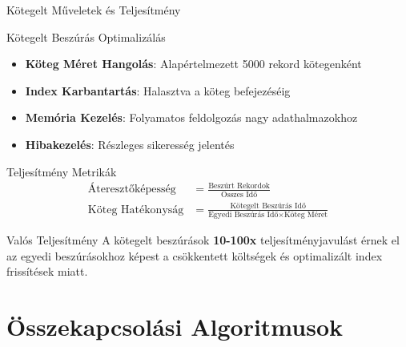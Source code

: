 \documentclass[aspectratio=169]{beamer}
\begin{document}
\begin{frame}{Kötegelt Műveletek és Teljesítmény}
\begin{block}{Kötegelt Beszúrás Optimalizálás}
\begin{itemize}
    \item \textbf{Köteg Méret Hangolás}: Alapértelmezett 5000 rekord kötegenként
    \item \textbf{Index Karbantartás}: Halasztva a köteg befejezéséig
    \item \textbf{Memória Kezelés}: Folyamatos feldolgozás nagy adathalmazokhoz
    \item \textbf{Hibakezelés}: Részleges sikeresség jelentés
\end{itemize}
\end{block}

\begin{block}{Teljesítmény Metrikák}
\begin{align}
\text{Áteresztőképesség} &= \frac{\text{Beszúrt Rekordok}}{\text{Összes Idő}} \\
\text{Köteg Hatékonyság} &= \frac{\text{Kötegelt Beszúrás Idő}}{\text{Egyedi Beszúrás Idő} \times \text{Köteg Méret}}
\end{align}
\end{block}

\begin{alertblock}{Valós Teljesítmény}
A kötegelt beszúrások \textbf{10-100x} teljesítményjavulást érnek el az egyedi beszúrásokhoz képest a csökkentett költségek és optimalizált index frissítések miatt.
\end{alertblock}
\end{frame}

\section{Összekapcsolási Algoritmusok}
\end{document}
